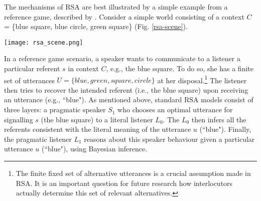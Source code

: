 The mechanisms of RSA are best illustrated by a simple example from a reference game, described by \textcite{frank2012predicting}.
Consider a simple world consisting of a context $C$ = \{blue square, blue circle, green square\} (Fig. \ref{rsa-scene}).
\begin{figure*}[t]
	\begin{center}
		\texttt{[image: rsa\_scene.png]}
	\end{center}
	\vspace{-0.3cm}
	\caption{A simple reference resolution example scenario: the context $C$ consists of three possible referents \parencite{frank2012predicting}}
	\label{rsa-scene}
\end{figure*}
In a reference game scenario, a speaker wants to communicate to a listener a particular referent $s$ in context $C$, e.g., the blue square. To do so, she has a finite set of utterances $U = \{blue, green, square, circle\}$ at her disposal.\footnote{The finite fixed set of alternative utterances is a crucial assumption made in RSA. It is an important question for future research how interlocutors actually determine this set of relevant alternatives.} The listener then tries to recover the intended referent (i.e., the blue square) upon receiving an utterance (e.g., ``blue"). 
As mentioned above, standard RSA models consist of three layers: a pragmatic speaker $S_1$ who chooses an optimal utterance for signalling $s$ (the blue square) to a literal listener $L_0$. The $L_0$ then infers all the referents consistent with the literal meaning of the utterance $u$ (``blue"). Finally, the pragmatic listener $L_1$ reasons about this speaker behaviour given a particular utterance $u$ (``blue"), using Bayesian inference.


